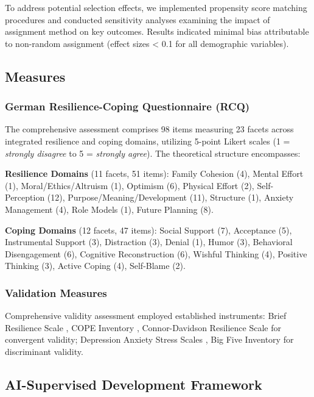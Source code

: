\documentclass[12pt,a4paper]{article}
\begin{document}
To address potential selection effects, we implemented propensity score matching procedures and conducted sensitivity analyses examining the impact of assignment method on key outcomes. Results indicated minimal bias attributable to non-random assignment (effect sizes < 0.1 for all demographic variables).

\subsection{Measures}

\subsubsection{German Resilience-Coping Questionnaire (RCQ)}

The comprehensive assessment comprises 98 items measuring 23 facets across integrated resilience and coping domains, utilizing 5-point Likert scales (1 = \textit{strongly disagree} to 5 = \textit{strongly agree}). The theoretical structure encompasses:

\textbf{Resilience Domains} (11 facets, 51 items): Family Cohesion (4), Mental Effort (1), Moral/Ethics/Altruism (1), Optimism (6), Physical Effort (2), Self-Perception (12), Purpose/Meaning/Development (11), Structure (1), Anxiety Management (4), Role Models (1), Future Planning (8).

\textbf{Coping Domains} (12 facets, 47 items): Social Support (7), Acceptance (5), Instrumental Support (3), Distraction (3), Denial (1), Humor (3), Behavioral Disengagement (6), Cognitive Reconstruction (6), Wishful Thinking (4), Positive Thinking (3), Active Coping (4), Self-Blame (2).

\subsubsection{Validation Measures}

Comprehensive validity assessment employed established instruments: Brief Resilience Scale \cite{Smith2008}, COPE Inventory \cite{Carver1997}, Connor-Davidson Resilience Scale \cite{Connor2003} for convergent validity; Depression Anxiety Stress Scales \cite{Lovibond1995}, Big Five Inventory \cite{John2008} for discriminant validity.

\subsection{AI-Supervised Development Framework}
\end{document}
